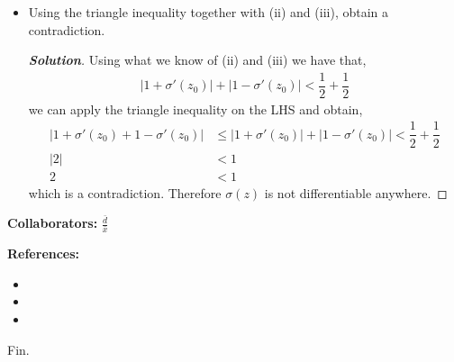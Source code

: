 \documentclass[11pt]{article}
\newenvironment{problem}[2][Problem\!]{\begin{trivlist}
\item[\hskip \labelsep {\bfseries #1}\hskip \labelsep {\bfseries #2}]}{\end{trivlist}}
\newenvironment{solution}{\begin{proof}[\textbf{\textit{Solution}}] }{\end{proof}}
\newcommand{\abs}[1]{\left\lvert#1\right\rvert} %
\renewcommand{\leq}{\leqslant}
\begin{document}
\begin{problem}{3.6}
\begin{itemize}[itemsep=3em]
\item[(iv)] Using the triangle inequality together with (ii) and (iii), obtain a contradiction.
\begin{solution}
  Using what we know of (ii) and (iii) we have that,
  \begin{align*}
      \abs{1 + \sigma'(z_0)} +\abs{1 - \sigma'(z_0)} < \dfrac{1}{2} + \dfrac{1}{2}
  \end{align*}
  we can apply the triangle inequality on the LHS and obtain,
  \begin{align*}
    \abs{1 + \sigma'(z_0) + 1 - \sigma'(z_0)} &\leq \abs{1 + \sigma'(z_0)} +\abs{1 - \sigma'(z_0)} < \dfrac{1}{2} + \dfrac{1}{2} \\
    \abs{2} &< 1 \\
    2 &< 1
  \end{align*}
  which is a contradiction. Therefore $\sigma(z)$ is not differentiable anywhere.  
\end{solution}

\end{itemize}
\end{problem}



\newpage  %

\begin{center}
\textbf{Collaborators:}
$\frac{\bar{d}}{\bar{x}}$
\end{center}
\vfill 

\begin{center}
\textbf{References:}
\end{center}
\begin{itemize}
\item[$\bullet$] [Book(s): Title, Author]
\item[$\bullet$] [Online: \href{http://example.com/}{\color{blue}Link}]
\item[$\bullet$] [Notes: \href{http://example.com/}{\color{blue}Link}]
\end{itemize}

\vfill
\begin{center}
Fin.
\end{center}
\vfill
\end{document}
